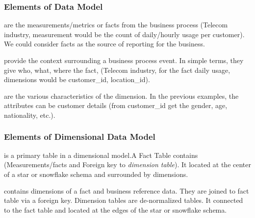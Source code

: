 \begin{frame}
    \frametitle{Elements of Data Model}
    \begin{description}[<+->]
        \item[Facts] are the measurements/metrics or facts from the business process \forexample (Telecom industry, measurement would be the count of daily/hourly usage per customer). We could consider facts as the source of reporting for the business.
        \item[Dimensions] provide the context surrounding a business process event. In simple terms, they give who, what, where the fact, \forexample (Telecom industry, for the fact daily usage, dimensions would be customer\_id, location\_id).
        
        \item[Attributes] are the various characteristics of the dimension. In the previous examples, the attributes can be customer details (from customer\_id get the gender, age, nationality, etc.).
    \end{description}
\end{frame}

\begin{frame}
    \frametitle{Elements of Dimensional Data Model}
    \begin{description}[<+->]
        \item[Fact Table] is a primary table in a dimensional model.A Fact Table contains (Measurements/facts and Foreign key to \textit{dimension table}). It located at the center of a star or snowflake schema and surrounded by dimensions.
        \item[Dimension table] contains dimensions of a fact and business reference data. They are joined to fact table via a foreign key. Dimension tables are de-normalized tables. It connected to the fact table and located at the edges of the star or snowflake schema.

    \end{description}
\end{frame}


